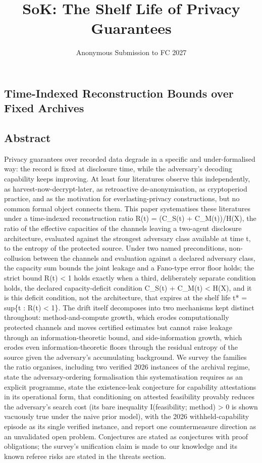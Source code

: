 \documentclass[
]{llncs}
\title{SoK: The Shelf Life of Privacy Guarantees}
\author{Anonymous Submission to FC 2027}
\institute{Anonymized for review}
\date{}
\begin{document}
\maketitle

\subsection{Time-Indexed Reconstruction Bounds over Fixed
Archives}\label{time-indexed-reconstruction-bounds-over-fixed-archives}

\subsection{Abstract}\label{abstract}

Privacy guarantees over recorded data degrade in a specific and
under-formalised way: the record is fixed at disclosure time, while the
adversary's decoding capability keeps improving. At least four
literatures observe this independently, as harvest-now-decrypt-later, as
retroactive de-anonymisation, as cryptoperiod practice, and as the
motivation for everlasting-privacy constructions, but no common formal
object connects them. This paper systematises these literatures under a
time-indexed reconstruction ratio R(t) = (C\_S(t) + C\_M(t))/H(X), the
ratio of the effective capacities of the channels leaving a two-agent
disclosure architecture, evaluated against the strongest adversary class
available at time t, to the entropy of the protected source. Under two
named preconditions, non-collusion between the channels and evaluation
against a declared adversary class, the capacity sum bounds the joint
leakage and a Fano-type error floor holds; the strict bound R(t)
\textless{} 1 holds exactly when a third, deliberately separate
condition holds, the declared capacity-deficit condition C\_S(t) +
C\_M(t) \textless{} H(X), and it is this deficit condition, not the
architecture, that expires at the shelf life t* = sup\{t : R(t)
\textless{} 1\}. The drift itself decomposes into two mechanisms kept
distinct throughout: method-and-compute growth, which erodes
computationally protected channels and moves certified estimates but
cannot raise leakage through an information-theoretic bound, and
side-information growth, which erodes even information-theoretic floors
through the residual entropy of the source given the adversary's
accumulating background. We survey the families the ratio organises,
including two verified 2026 instances of the archival regime, state the
adversary-ordering formalisation this systematisation requires as an
explicit programme, state the existence-leak conjecture for capability
attestations in its operational form, that conditioning on attested
feasibility provably reduces the adversary's search cost (its bare
inequality I(feasibility; method) \textgreater{} 0 is shown vacuously
true under the naive prior model), with the 2026 withheld-capability
episode as its single verified instance, and report one countermeasure
direction as an unvalidated open problem. Conjectures are stated as
conjectures with proof obligations; the survey's unification claim is
made to our knowledge and its known referee risks are stated in the
threats section.
\end{document}
